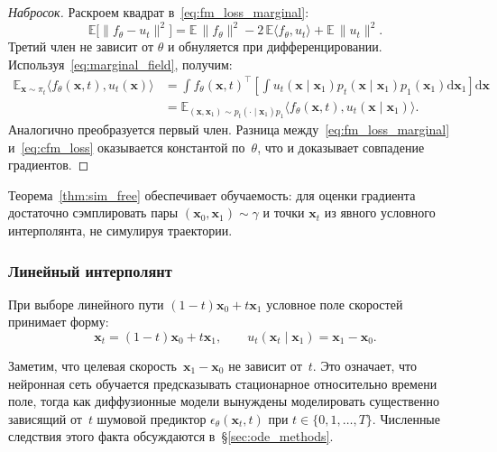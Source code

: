 \begin{proof}[Набросок]
Раскроем квадрат в~\eqref{eq:fm_loss_marginal}:
\[
    \mathbb{E}\bigl[\lVert f_\theta-u_t\rVert^2\bigr]
    = \mathbb{E}\,\lVert f_\theta\rVert^2 - 2\,\mathbb{E}\langle f_\theta, u_t\rangle + \mathbb{E}\,\lVert u_t\rVert^2.
\]
Третий член не зависит от $\theta$ и обнуляется при дифференцировании. Используя~\eqref{eq:marginal_field}, получим:
\begin{align*}
    \mathbb{E}_{\mathbf{x}\sim\pi_t}\langle f_\theta(\mathbf{x},t), u_t(\mathbf{x})\rangle
    &= \int f_\theta(\mathbf{x},t)^\top\!\left[\int u_t(\mathbf{x}\mid\mathbf{x}_1) p_t(\mathbf{x}\mid\mathbf{x}_1) p_1(\mathbf{x}_1) \mathrm{d}\mathbf{x}_1\right]\mathrm{d}\mathbf{x}\\
    &= \mathbb{E}_{(\mathbf{x},\mathbf{x}_1)\sim p_t(\cdot\mid\mathbf{x}_1)p_1}\langle f_\theta(\mathbf{x},t), u_t(\mathbf{x}\mid\mathbf{x}_1)\rangle.
\end{align*}
Аналогично преобразуется первый член. Разница между~\eqref{eq:fm_loss_marginal} и~\eqref{eq:cfm_loss} оказывается константой по~$\theta$, что и доказывает совпадение градиентов.
\end{proof}

Теорема~\ref{thm:sim_free} обеспечивает обучаемость: для оценки градиента достаточно сэмплировать пары $(\mathbf{x}_0,\mathbf{x}_1)\sim\gamma$ и точки $\mathbf{x}_t$ из явного условного интерполянта, не симулируя траектории.

\subsubsection{Линейный интерполянт}

При выборе линейного пути $(1-t)\mathbf{x}_0+t\mathbf{x}_1$ условное поле скоростей принимает форму:
\begin{equation}
    \mathbf{x}_t = (1-t)\mathbf{x}_0 + t\mathbf{x}_1, \qquad
    u_t(\mathbf{x}_t\mid\mathbf{x}_1) = \mathbf{x}_1-\mathbf{x}_0.
    \label{eq:linear_interp}
\end{equation}

Заметим, что целевая скорость~$\mathbf{x}_1-\mathbf{x}_0$ не зависит от~$t$. Это означает, что нейронная сеть обучается предсказывать стационарное относительно времени поле, тогда как диффузионные модели вынуждены моделировать существенно зависящий от~$t$ шумовой предиктор $\epsilon_\theta(\mathbf{x}_t,t)$ при $t\in\{0,1,\ldots,T\}$. Численные следствия этого факта обсуждаются в~\S\ref{sec:ode_methods}.

